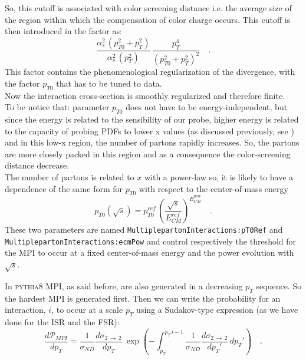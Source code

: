 \noindent So, this cutoff is associated with color screening distance i.e. the average size of the region within which the  compensation of color charge occurs.
This cutoff is then introduced in the factor as:
\begin{equation}
	\frac{\alpha_s^2\,(p_{T0}^2+p_{T}^2)}{\alpha_s^2\,(p_T^2)}\,\frac{p_T^4}{(p_{T0}^2+p_T^2)^2}\quad .
\end{equation}
This factor contains the phenomenological regularization of the divergence, with the factor $p_{T0}$ that has to be tuned to data. 
\\
Now the interaction cross-section is smoothly regularized and therefore finite.
\\
To be notice that: parameter $p_{T0}$ does not have to be energy-independent, but since the energy is related to the sensibility of our probe, higher energy is related to the capacity of probing PDFs to lower x values (as discussed previously, see ) and in this low-x region, the number of partons rapidly increases. So, the partons are more closely packed in this region and as a consequence the color-screening distance decrease.
\\
The number of partons is related to $x$ with a power-law so, it is likely to have a dependence of the same form for $p_{T0}$ with respect to the center-of-mass energy
\begin{equation}
	p_{T0}(\sqrt{s})=p_{T0}^{ref} \,\left( \frac{\sqrt{s}}{E_{CM}^{ref}} \right)^{E_{CM}^{pow}}\quad .
\end{equation}
These two parameters are named \texttt{MultiplepartonInteractions:}\-\texttt{pT0Ref} and \texttt{Mul}\-\texttt{tiple}\-\texttt{partonInteractions:}\-\texttt{ecmPow} and control respectively the threshold for the MPI to occur at a fixed center-of-mass energy and the power evolution with $\sqrt{s}$. 


In \textsc{pythia}8 MPI, as said before, are also generated in a decreasing $p_T$ sequence. So the hardest MPI is generated first. Then we can write the probability for an interaction, $i$, to occur at a scale $p_T$ using a Sudakov-type expression (as we have done for the ISR and the FSR):
\begin{equation}
	\frac{d\mathcal{P}_{MPI}}{dp_T}=\frac{1}{\sigma_{ND}}\frac{d\sigma_{2\,\rightarrow\,2}}{dp_T}\ \exp\left( -\displaystyle\int_{p_T}^{p_T\,i-1} \frac{1}{\sigma_{ND}}\frac{d\sigma_{2\,\rightarrow\,2}}{dp_T'}\,dp_T' \right)\quad .
\end{equation}


